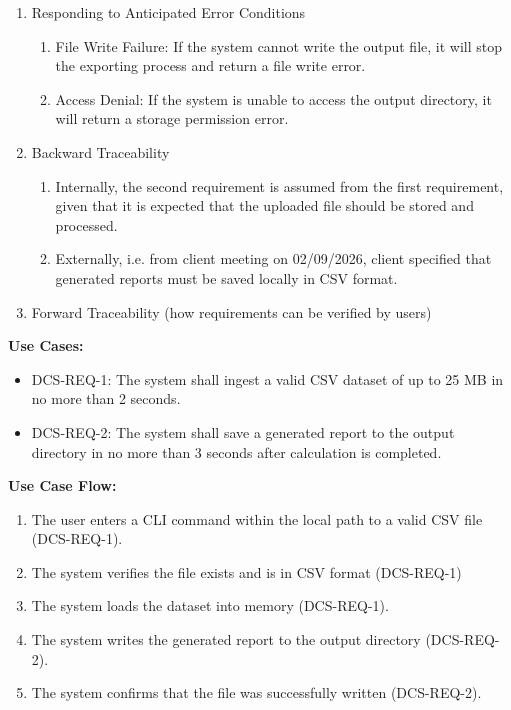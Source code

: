 \documentclass[
]{article}
\begin{document}
\begin{enumerate}
\def\labelenumi{\alph{enumi}.}
\item
  Responding to Anticipated Error Conditions

  \begin{enumerate}
  \def\labelenumii{\roman{enumii}.}
  \item
    File Write Failure: If the system cannot write the output file, it
    will stop the exporting process and return a file write error.
  \item
    Access Denial: If the system is unable to access the output
    directory, it will return a storage permission error.
  \end{enumerate}
\item
  Backward Traceability

  \begin{enumerate}
  \def\labelenumii{\roman{enumii}.}
  \item
    Internally, the second requirement is assumed from the first
    requirement, given that it is expected that the uploaded file should
    be stored and processed.
  \item
    Externally, i.e. from client meeting on 02/09/2026, client specified
    that generated reports must be saved locally in CSV format.
  \end{enumerate}
\item
  Forward Traceability (how requirements can be verified by users)
\end{enumerate}

\textbf{Use Cases:}

\begin{itemize}
\item
  DCS-REQ-1: The system shall ingest a valid CSV dataset of up to 25 MB
  in no more than 2 seconds.
\item
  DCS-REQ-2: The system shall save a generated report to the output
  directory in no more than 3 seconds after calculation is completed.
\end{itemize}

\textbf{Use Case Flow:}

\begin{enumerate}
\def\labelenumi{\alph{enumi}.}
\item
  The user enters a CLI command within the local path to a valid CSV
  file (DCS-REQ-1).
\item
  The system verifies the file exists and is in CSV format (DCS-REQ-1)
\item
  The system loads the dataset into memory (DCS-REQ-1).
\item
  The system writes the generated report to the output directory
  (DCS-REQ-2).
\item
  The system confirms that the file was successfully written
  (DCS-REQ-2).
\end{enumerate}
\end{document}

